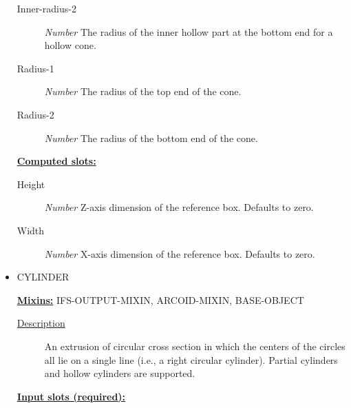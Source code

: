 \documentclass [11pt]{book}
\begin{document}
\begin{itemize}
\begin{description}
\item [Inner-radius-2]
\emph{Number} The radius of the inner hollow part at the bottom end for a hollow cone.


\item [Radius-1]
\emph{Number} The radius of the top end of the cone.


\item [Radius-2]
\emph{Number} The radius of the bottom end of the cone.


\end{description}






\textbf{
\underline{Computed slots:}}

\begin{description}

\item [Height]
\emph{Number} Z-axis dimension of the reference box. Defaults to zero.


\item [Width]
\emph{Number} X-axis dimension of the reference box. Defaults to zero.


\end{description}







\item {}CYLINDER


\textbf{
\underline{Mixins:}} IFS-OUTPUT-MIXIN, ARCOID-MIXIN, BASE-OBJECT





\begin{description}

\item [
\underline{Description}]


An extrusion of circular cross section in which the 
centers of the circles all lie on a single line (i.e., a right circular cylinder).
Partial cylinders and hollow cylinders are supported.



\end{description}








\textbf{
\underline{Input slots (required):}}


\end{itemize}
\end{document}
